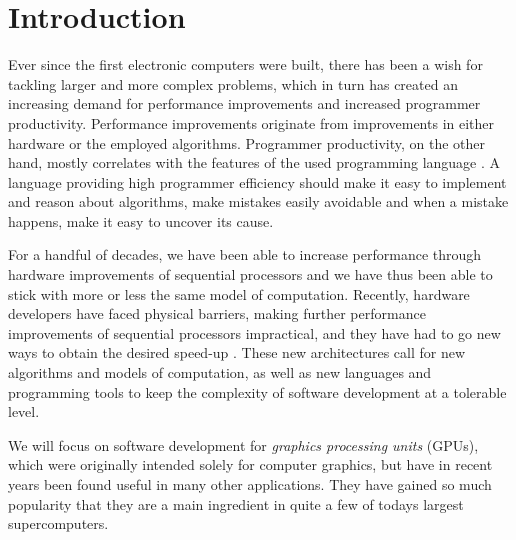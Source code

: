 
\chapter{Introduction}
Ever since the first electronic computers were built, there has been a
wish for tackling larger and more complex problems, which in turn has
created an increasing demand for performance improvements and
increased programmer productivity. Performance improvements originate
from improvements in either hardware or the employed
algorithms. Programmer productivity, on the other hand, mostly
correlates with the features of the used programming language
. A language providing high programmer efficiency should make
it easy to implement and reason about algorithms, make mistakes easily
avoidable and when a mistake happens, make it easy to uncover its
cause. 

For a handful of decades, we have been able to increase performance
through hardware improvements of sequential processors and we have
thus been able to stick with more or less the same model of
computation. Recently, hardware developers have faced physical
barriers, making further performance improvements of sequential
processors impractical, and they have had to go new ways to obtain the
desired speed-up \cite{no free lunch}. These new architectures call
for new algorithms and models of computation, as well as new languages
and programming tools to keep the complexity of software development
at a tolerable level.

We will focus on software development for \textit{graphics processing
 units} (GPUs), which were originally intended solely for computer
graphics, but have in recent years been found useful in many other
applications. They have gained so much popularity that they are a main
ingredient in quite a few of todays largest
supercomputers. 

